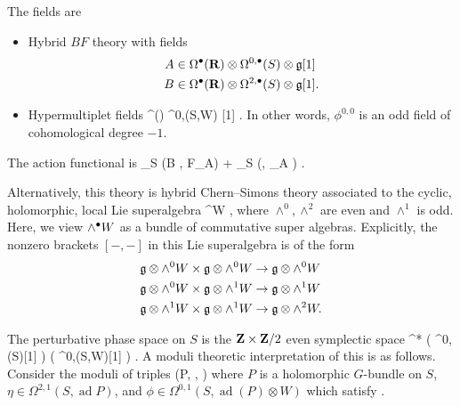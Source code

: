 \documentclass[11pt]{amsart}
\renewcommand{\op}{\operatorname}
\begin{document}
The fields are
\begin{itemize}
\item Hybrid $BF$ theory with fields
\begin{align*}
A & \in \Omega^{\bullet}(\mathbf{R}) \otimes \Omega^{0,\bullet}(S) \otimes \mathfrak{g} [1] \\
B & \in \Omega^{\bullet}(\mathbf{R}) \otimes \Omega^{2,\bullet}(S)\otimes \mathfrak{g} [1] .
\end{align*}
\item Hypermultiplet fields
\beqn
\phi \in \Omega^\bu(\R) \otimes \Omega^{0,\bu}(S,\Pi W) [1] .
\eeqn
In other words, $\phi^{0,0}$ is an odd field of cohomological degree $-1$.
\end{itemize}
The action functional is
\beqn
\int_{\R \times S} (B , F_A) +  \int_{\R \times S} (\phi, \dbar_A \phi) .
\eeqn

Alternatively, this theory is hybrid Chern--Simons theory associated to the cyclic, holomorphic, local Lie superalgebra
\beqn
{} \otimes \wedge^\bu W ,
\eeqn
where $\wedge^0, \wedge^2$ are even and $\wedge^1$ is odd.
Here, we view $\wedge^\bullet W$ as a bundle of commutative super algebras.
Explicitly, the nonzero brackets $[-,-]$ in this Lie superalgebra is of the form
\begin{align*}
\mathfrak{g} \otimes \wedge^0 W \times \mathfrak{g} \otimes \wedge^0 W & \to \mathfrak{g} \otimes \wedge^0 W  \\
\mathfrak{g} \otimes \wedge^0 W \times \mathfrak{g} \otimes \wedge^1 W & \to \mathfrak{g} \otimes \wedge^1 W \\
\mathfrak{g} \otimes \wedge^1 W \times \mathfrak{g} \otimes \wedge^1 W & \to \mathfrak{g} \otimes \wedge^2 W .
\end{align*}

The perturbative phase space on $S$ is the $\mathbf{Z} \times \mathbf{Z}/2$ even symplectic space
\beqn
\T^* \left(  \otimes \Omega^{0,\bu}(S)[1] \right) \oplus \Pi \left( \otimes \Omega^{0,\bu}(S,W)[1] \right) .
\eeqn
A moduli theoretic interpretation of this is as follows.
Consider the moduli of triples
\beqn
(P, \eta, \phi)
\eeqn
where $P$ is a holomorphic $G$-bundle on $S$, $\eta \in \Omega^{2,1}(S, \op{ad} P)$, and $\phi \in \Omega^{0,1}(S,\op{ad}(P) \otimes W)$ which satisfy .
\end{document}

